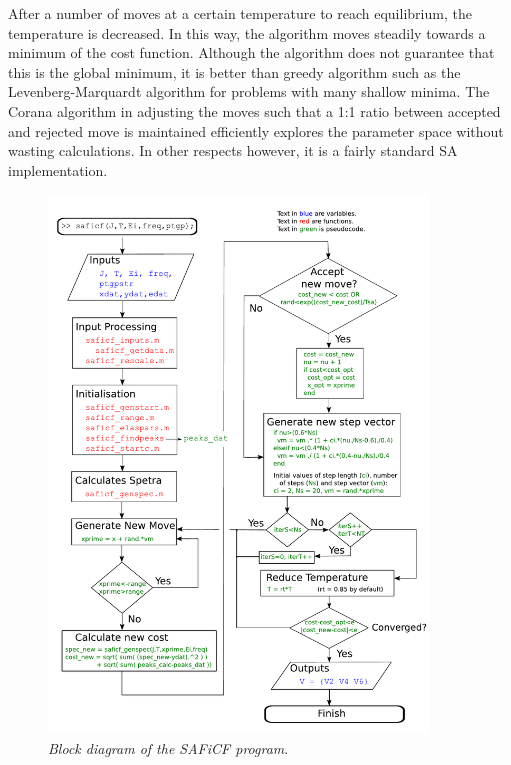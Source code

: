 \documentclass[12pt,onecolumn,tightenlines,aps,amsmath,floatfix,notitlepage,nofootinbib]{revtex4}
\begin{document}
After a number of moves at a certain temperature to reach equilibrium, the temperature is decreased. In this way, the algorithm moves steadily towards a minimum of the cost function. Although the algorithm does not guarantee that this is the global minimum, it is better than greedy algorithm such as the Levenberg-Marquardt algorithm for problems with many shallow minima. The Corana algorithm in adjusting the moves such that a 1:1 ratio between accepted and rejected move is maintained efficiently explores the parameter space without wasting calculations. In other respects however, it is a fairly standard SA implementation.

\begin{figure}
  \begin{center}
    \includegraphics[width=0.9\textwidth, viewport=14 17 590 816]{figs/block.pdf}
    \caption{\emph{Block diagram of the SAFiCF program}.} \label{fg:block}
  \end{center}
\end{figure}
\end{document}
